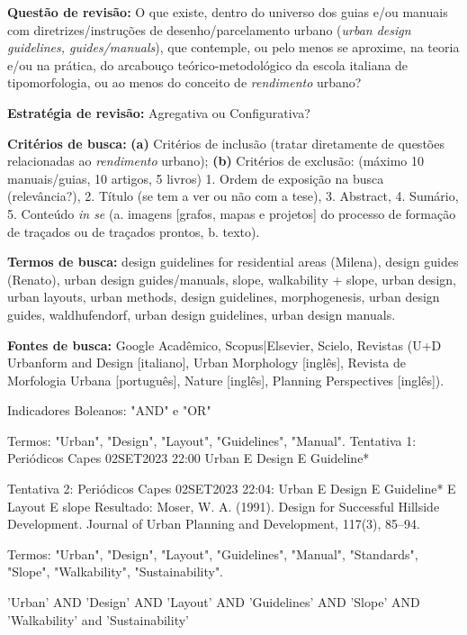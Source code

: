 \documentclass[]{report}
\begin{document}
				\textbf{Questão de revisão:} O que existe, dentro do universo dos guias e/ou manuais com diretrizes/instruções de desenho/parcelamento urbano (\textit{urban design guidelines, guides/manuals}), que contemple, ou pelo menos se aproxime, na teoria e/ou na prática, do arcabouço teórico-metodológico da escola italiana de tipomorfologia, ou ao menos do conceito de \textit{rendimento} urbano?

				\textbf{Estratégia de revisão:} Agregativa ou Configurativa?

				\textbf{Critérios de busca:} \textbf{(a)} Critérios de inclusão (tratar diretamente de questões relacionadas ao \textit{rendimento} urbano); \textbf{(b)} Critérios de exclusão: (máximo 10 manuais/guias, 10 artigos, 5 livros) 1. Ordem de exposição na busca (relevância?), 2. Título (se tem a ver ou não com a tese), 3. Abstract, 4. Sumário, 5. Conteúdo \textit{in se} (a. imagens [grafos, mapas e projetos] do processo de formação de traçados ou de traçados prontos, b. texto).

				\textbf{Termos de busca:} design guidelines for residential areas (Milena), design guides (Renato), urban design guides/manuals, slope, walkability + slope, urban design, urban layouts, urban methods, design guidelines, morphogenesis, urban design guides, waldhufendorf, urban design guidelines, urban design manuals.

				\textbf{Fontes de busca:} Google Acadêmico, Scopus|Elsevier, Scielo, Revistas (U+D Urbanform and Design [italiano], Urban Morphology [inglês], Revista de Morfologia Urbana [português], Nature [inglês], Planning Perspectives [inglês]).

				Indicadores Boleanos: "AND" e "OR"

				Termos: "Urban", "Design", "Layout", "Guidelines", "Manual".
				Tentativa 1: Periódicos Capes 02SET2023 22:00 Urban E Design E Guideline*


				Tentativa 2: Periódicos Capes 02SET2023 22:04: Urban E Design E Guideline* E Layout E slope
				Resultado: Moser, W. A. (1991). Design for Successful Hillside Development. Journal of Urban Planning and Development, 117(3), 85–94.

				Termos: "Urban", "Design", "Layout", "Guidelines", "Manual", "Standards", "Slope", "Walkability", "Sustainability".

				'Urban' AND 'Design' AND 'Layout' AND 'Guidelines' AND 'Slope' AND 'Walkability' and 'Sustainability'

				
\end{document}
